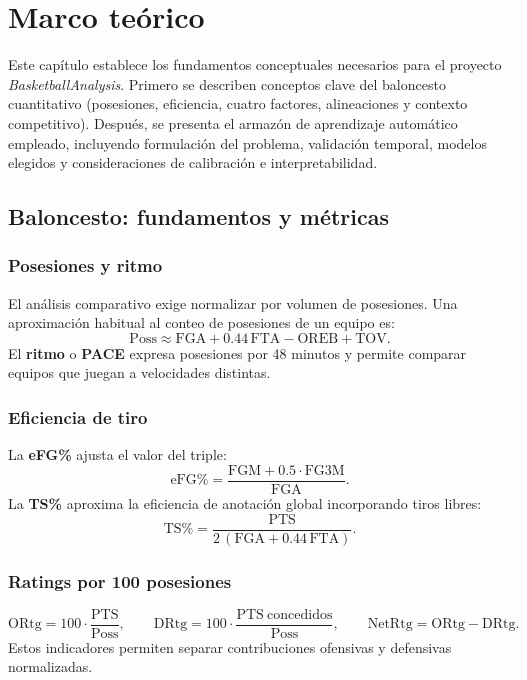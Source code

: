 \chapter{Marco teórico}\label{chap:marco}

Este capítulo establece los fundamentos conceptuales necesarios para el proyecto \textit{BasketballAnalysis}. 
Primero se describen conceptos clave del baloncesto cuantitativo (posesiones, eficiencia, cuatro factores, 
alineaciones y contexto competitivo). Después, se presenta el armazón de aprendizaje automático empleado, 
incluyendo formulación del problema, validación temporal, modelos elegidos y consideraciones de calibración e interpretabilidad.

\section{Baloncesto: fundamentos y métricas}\label{sec:baloncesto}

\subsection*{Posesiones y ritmo}
El análisis comparativo exige normalizar por volumen de posesiones. Una aproximación habitual al conteo de posesiones de un equipo es:
\begin{equation}
\mathrm{Poss} \approx \mathrm{FGA} + 0.44\,\mathrm{FTA} - \mathrm{OREB} + \mathrm{TOV}.
\end{equation}
El \textbf{ritmo} o \textbf{PACE} expresa posesiones por 48 minutos y permite comparar equipos que juegan a velocidades distintas.

\subsection*{Eficiencia de tiro}
La \textbf{eFG\%} ajusta el valor del triple:
\begin{equation}
\mathrm{eFG\%} = \frac{\mathrm{FGM} + 0.5 \cdot \mathrm{FG3M}}{\mathrm{FGA}}.
\end{equation}
La \textbf{TS\%} aproxima la eficiencia de anotación global incorporando tiros libres:
\begin{equation}
\mathrm{TS\%} = \frac{\mathrm{PTS}}{2\,(\mathrm{FGA} + 0.44\,\mathrm{FTA})}.
\end{equation}

\subsection*{Ratings por 100 posesiones}
\begin{equation}
\mathrm{ORtg} = 100 \cdot \frac{\mathrm{PTS}}{\mathrm{Poss}}, \qquad
\mathrm{DRtg} = 100 \cdot \frac{\mathrm{PTS\ concedidos}}{\mathrm{Poss}}, \qquad
\mathrm{NetRtg} = \mathrm{ORtg} - \mathrm{DRtg}.
\end{equation}
Estos indicadores permiten separar contribuciones ofensivas y defensivas normalizadas.

